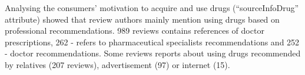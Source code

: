 \documentclass[a4paper,fleqn,longmktitle]{cas-dc}
\begin{document}

Analysing the consumers' motivation to acquire and use drugs (``sourceInfoDrug'' attribute) showed that review authors mainly mention using drugs based on professional recommendations. 989 reviews contains references of doctor prescriptions, 262 - refers to pharmaceutical specialists recommendations and 252 - doctor recommendations. Some reviews reports about using drugs recommended by relatives (207 reviews), advertisement (97) or internet (15).
\end{document}
